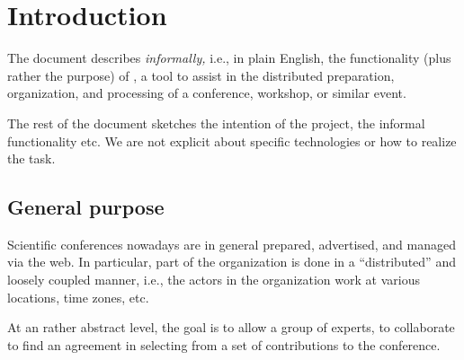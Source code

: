 \section{Introduction}
\label{sec:introduction}




The document describes \emph{informally,} i.e., in plain English, the
functionality (plus rather the purpose) of \Coma, a tool to assist in the
distributed preparation, organization, and processing of a conference,
workshop, or similar event.

The rest of the document sketches the intention of the project, the
informal functionality etc. We are not explicit about specific technologies
or how to realize the task.


\iffalse

As we intend to start \emph{early} with the \emph{integration}, the
required methods should be provided rather quickly without being (fully)
implemented (i.e., as \textit{stubs}). See also the time-line of the
project.

We provide as starting point a first implementation of the abstract syntax
(cf.\ Section~\ref{sec:abstractsyntax}) and a small textual printer in the
utilities package.



If from the perspective of a package, changes or extensions seem necessary
or desirable as far as the abstract syntax is concerned, the wish should be
uttered and justified as early as possible to all participants (and then
potentially implemented by us or the requester, if everyone agrees).

\fi




\subsection{General purpose}
\label{sec:purpose}

Scientific conferences nowadays are in general prepared, advertised, and
managed via the web. In particular, part of the organization is done in a
``distributed'' and loosely coupled manner, i.e., the actors in the
organization work at various locations, time zones, etc.

At an rather abstract level, the goal is to allow a group of experts, to
collaborate to find an agreement in selecting from a set of contributions
to the conference.






